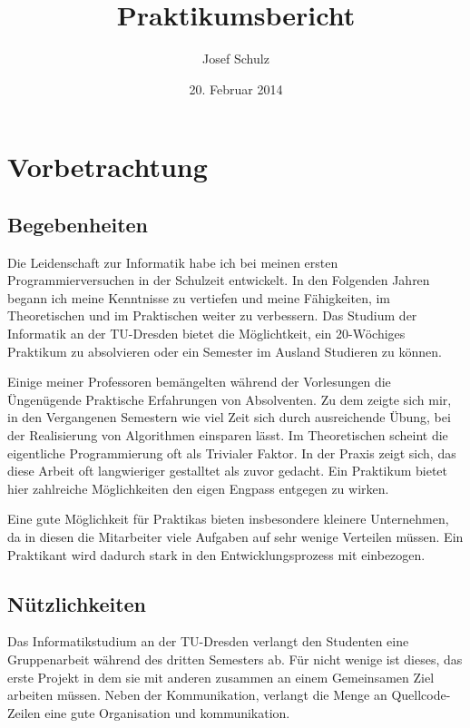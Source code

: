 \documentclass{scrartcl}
\title{Praktikumsbericht}
\author{Josef Schulz}
\date{20. Februar 2014}
\begin{document}
 
\maketitle

\newpage

\tableofcontents

\newpage

\section{Vorbetrachtung}

\subsection{Begebenheiten}

Die Leidenschaft zur Informatik habe ich bei meinen ersten Programmierversuchen in der Schulzeit entwickelt.
In den Folgenden Jahren begann ich meine Kenntnisse zu vertiefen und meine Fähigkeiten, im Theoretischen
und im Praktischen weiter zu verbessern. Das Studium der Informatik an der TU-Dresden bietet die Möglichtkeit,
ein 20-Wöchiges Praktikum zu absolvieren oder ein Semester im Ausland Studieren zu können.

Einige meiner Professoren bemängelten während der Vorlesungen die Üngenügende Praktische Erfahrungen von
Absolventen. Zu dem zeigte sich mir, in den Vergangenen Semestern wie viel Zeit sich durch ausreichende Übung,
bei der Realisierung von Algorithmen einsparen lässt. Im Theoretischen scheint die eigentliche Programmierung
oft als Trivialer Faktor. In der Praxis zeigt sich, das diese Arbeit oft langwieriger gestalltet als zuvor
gedacht. Ein Praktikum bietet hier zahlreiche Möglichkeiten den eigen Engpass entgegen zu wirken.

Eine gute Möglichkeit für Praktikas bieten insbesondere kleinere Unternehmen, da in diesen die Mitarbeiter
viele Aufgaben auf sehr wenige Verteilen müssen. Ein Praktikant wird dadurch stark in den Entwicklungsprozess
mit einbezogen. 

\subsection{Nützlichkeiten}

Das Informatikstudium an der TU-Dresden verlangt den Studenten eine Gruppenarbeit während des dritten Semesters
ab. Für nicht wenige ist dieses, das erste Projekt in dem sie mit anderen zusammen an einem Gemeinsamen Ziel
arbeiten müssen. Neben der Kommunikation, verlangt die Menge an Quellcode-Zeilen eine gute Organisation und
kommunikation. 
\end{document}
